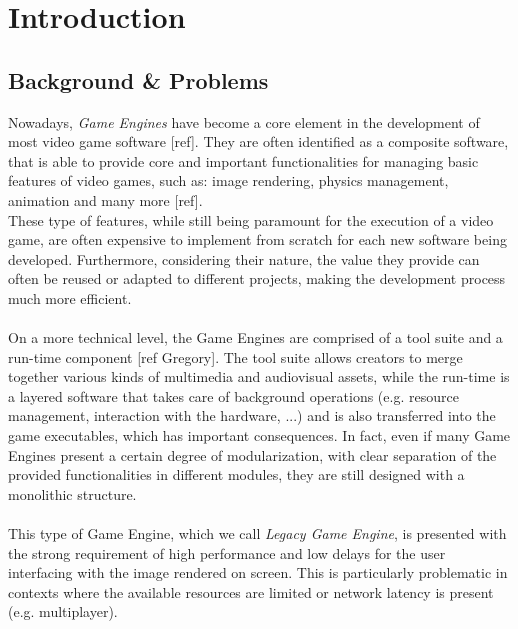 
\chapter{Introduction}
\label{cap:introduction}

\section{Background \& Problems}
Nowadays, \textit{Game Engines} have become a core element in the development of most video game software [ref]. They are often identified as a composite software, that is able to provide core and important functionalities for managing basic features of video games, such as: image rendering, physics management, animation and many more [ref]. \\
These type of features, while still being paramount for the execution of a video game, are often expensive to implement from scratch for each new software being developed. Furthermore, considering their nature, the value they provide can often be reused or adapted to different projects, making the development process much more efficient. \\ \\
On a more technical level, the Game Engines are comprised of a tool suite and a run-time component [ref Gregory]. The tool suite allows creators to merge together various kinds of multimedia and audiovisual assets, while the run-time is a layered software that takes care of background operations (e.g. resource management, interaction with the hardware, ...) and is also transferred into the game executables, which has important consequences. In fact, even if many Game Engines present a certain degree of modularization, with clear separation of the provided functionalities in different modules, they are still designed with a monolithic structure. \\ \\
This type of Game Engine, which we call \textit{Legacy Game Engine}, is presented with the strong requirement of high performance and low delays for the user interfacing with the image rendered on screen. This is particularly problematic in contexts where the available resources are limited or network latency is present (e.g. multiplayer). \\
